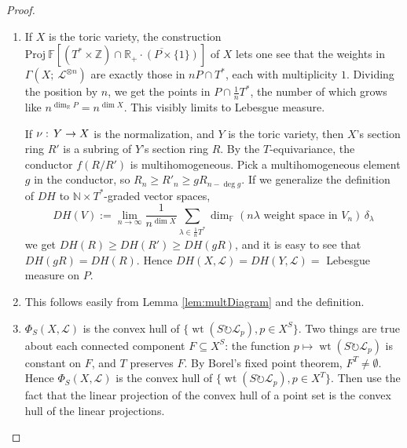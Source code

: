 \documentclass[11pt]{amsart}
\theoremstyle{definition}
\DeclareMathOperator{\wt}{wt}
\newcommand{\RR}{\mathbb{R}}
\newcommand{\ZZ}{\mathbb{Z}}
\newcommand{\NN}{\mathbb{N}}
\newcommand\wh\widehat
\newcommand\FF{{\mathbb F}}
\newcommand\tensor\otimes
\newcommand\calL{{\mathcal L}}
\newcommand\onto\twoheadrightarrow
\newcommand\junk[1]{}
\newcommand\actson\circlearrowright
\renewcommand{\colon}{\mathrel{:}}
\renewcommand{\colon}{:\mkern\thinmuskip}
\begin{document}
\begin{proof}
  \begin{enumerate}
  \item If $X$ is the toric variety, the construction ${\mathrm {Proj}}\
   \FF\left[(T^* \times \ZZ) \cap \overline{\RR_+\cdot (P \times \{1\})}\right]$
    of $X$ lets
    one see that the weights in $\Gamma(X;\ \calL^{\tensor n})$ are exactly those
    in $nP \cap T^*$, each with multiplicity $1$. Dividing the position by $n$,
    we get the points in $P \cap \frac{1}{n}T^*$, the number of which grows like
    $n^{\dim_\RR P} = n^{\dim X}$. This visibly limits to Lebesgue measure.

    If $\nu\colon Y\to X$ is the normalization, and $Y$ is the toric variety,
    then $X$'s section ring $R'$ is a subring of $Y$'s section ring $R$.
    By the $T$-equivariance, the conductor $f(R/R')$ is multihomogeneous.
    Pick a multihomogeneous element $g$ in the conductor,
    so $R_n \geq R'_n \geq g R_{n-\deg g}$. If we generalize the definition
    of $DH$ to $\NN\times T^*$-graded vector spaces,
    \[ DH(V) :=  \lim_{n\to\infty} \frac{1}{n^{\dim X}}
    \sum_{\lambda \in \frac{1}{n}T^*}
    \dim_\FF(n\lambda\text{ weight space in }V_n)    \, \delta_\lambda
    \]
    we get $DH(R) \geq DH(R') \geq DH(gR)$, and it is easy to see
    that $DH(gR) = DH(R)$. Hence $DH(X,\calL) = DH(Y,\calL)=$ Lebesgue measure
    on $P$.
  \item This follows easily from Lemma \ref{lem:multDiagram} and the definition.
  \item $\Phi_S(X,\calL)$ is the convex hull of $\{\wt(S\actson \calL_p), p\in X^S\}$.
    Two things are true about each connected component $F \subseteq X^S$:
    the function $p\mapsto \wt(S\actson \calL_p)$ is constant on $F$,
    and $T$ preserves $F$. By Borel's fixed point theorem, $F^T \neq \emptyset$.
    Hence $\Phi_S(X,\calL)$ is the convex hull of $\{\wt(S\actson \calL_p), p\in X^T\}$.
    Then use the fact that the linear projection of the convex hull of a point set 
    is the convex hull of the linear projections.
    \junk{
  \item Pick a point $p\in X^T$ (using Borel's theorem again) and let
    $\lambda := \wt(T\actson \calL_p)$, so $T$ acts trivially on
    $(\calL \tensor \FF_{-\lambda})_p$ where the second factor
    is the trivial (but not equivariantly trivial) line bundle.
    Let $R \leq T$ be the generic stabilizer, or equivalently, be the kernel
    of the action on $X$. Since $R$ acts trivially on $X$,
    it acts with the same weight on each fiber of $\calL \tensor \FF_{-\lambda}$,
    which (checking at $p$) is $0$. 
    Let $h$ be the projection $T \onto T/R$, and use (2) to obtain
    $$ \Phi_T(X,\calL)
    = \Phi_T(X,\calL\tensor \FF_{-\lambda}) + \lambda
    = \wh h\left(\Phi_{T/R}(X,\calL\tensor \FF_{-\lambda})\right) + \lambda $$
    hence
    $$ \dim_\RR \Phi_T(X,\calL) = \dim_\RR \Phi_{T/R}(X,\calL\tensor \FF_{-\lambda}) $$
    reducing the statement to the case of faithfully acting tori.

}
\end{enumerate}
\end{proof}
\end{document}
